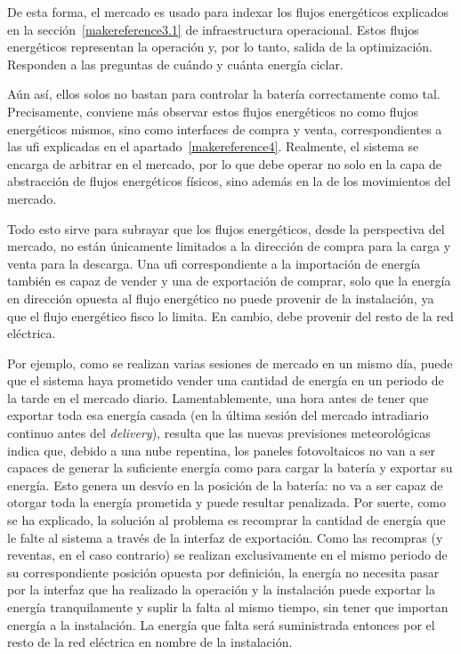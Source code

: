 De esta forma, el mercado es usado para indexar los flujos energéticos explicados en la sección~\ref{makereference3.1} de infraestructura operacional. Estos flujos energéticos representan la operación y, por lo tanto, salida de la optimización. Responden a las preguntas de cuándo y cuánta energía ciclar.

Aún así, ellos solos no bastan para controlar la batería correctamente como tal. Precisamente, conviene más observar estos flujos energéticos no como flujos energéticos mismos, sino como interfaces de compra y venta, correspondientes a las \gls{ufi} explicadas en el apartado~\ref{makereference4}. Realmente, el sistema se encarga de arbitrar en el mercado, por lo que debe operar no solo en la capa de abstracción de flujos energéticos físicos, sino además en la de los movimientos del mercado.

Todo esto sirve para subrayar que los flujos energéticos, desde la perspectiva del mercado, no están únicamente limitados a la dirección de compra para la carga y venta para la descarga. Una \gls{ufi} correspondiente a la importación de energía también es capaz de vender y una de exportación de comprar, solo que la energía en dirección opuesta al flujo energético no puede provenir de la instalación, ya que el flujo energético fisco lo limita. En cambio, debe provenir del resto de la red eléctrica.

Por ejemplo, como se realizan varias sesiones de mercado en un mismo día, puede que el sistema haya prometido vender una cantidad de energía en un periodo de la tarde en el mercado diario. Lamentablemente, una hora antes de tener que exportar toda esa energía casada (en la última sesión del mercado intradiario continuo antes del \textit{delivery}), resulta que las nuevas previsiones meteorológicas indica que, debido a una nube repentina, los paneles fotovoltaicos no van a ser capaces de generar la suficiente energía como para cargar la batería y exportar su energía. Esto genera un desvío en la posición de la batería: no va a ser capaz de otorgar toda la energía prometida y puede resultar penalizada. Por suerte, como se ha explicado, la solución al problema es recomprar la cantidad de energía que le falte al sistema a través de la interfaz de exportación. Como las recompras (y reventas, en el caso contrario) se realizan exclusivamente en el mismo periodo de su correspondiente posición opuesta por definición, la energía no necesita pasar por la interfaz que ha realizado la operación y la instalación puede exportar la energía tranquilamente y suplir la falta al mismo tiempo, sin tener que importan energía a la instalación. La energía que falta será suministrada entonces por el resto de la red eléctrica en nombre de la instalación.

